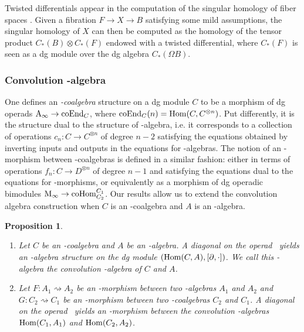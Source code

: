 \documentclass[10pt]{amsart}
\newtheorem{proposition}[definition]{Proposition}
\theoremstyle{remark}
\begin{document}
Twisted differentials appear in the computation of the singular homology of fiber spaces \cite{Brown59}. 
Given a fibration $F \rightarrow X \rightarrow B$ satisfying some mild assumptions, the singular homology of $X$ can then be computed as the homology of the tensor product $C_*(B) \otimes C_*(F)$ endowed with a twisted differential, where $C_*(F)$ is seen as a dg module over the dg algebra $C_*(\Omega B)$.

\subsubsection{Convolution \Ainf -algebra} \label{sss:conv-ainf-alg}

One defines an \textit{\Ainf -coalgebra} structure on a dg module $C$ to be a morphism of dg operads $\mathrm{A}_\infty \rightarrow \mathrm{coEnd}_C$, where $\mathrm{coEnd}_C(n) = \mathrm{Hom} ( C , C^{\otimes n} )$. 
Put differently, it is the structure dual to the structure of \Ainf -algebra, i.e. it corresponds to a collection of operations $c_n : C \rightarrow C^{\otimes n}$ of degree $n-2$ satisfying the equations obtained by inverting inputs and outputs in the equations for \Ainf -algebras. 
The notion of an \Ainf -morphism between \Ainf -coalgebras is defined in a similar fashion: either in terms of operations $f_n : C \rightarrow D^{\otimes n}$ of degree $n-1$ and satisfying the equations dual to the equations for \Ainf -morphisms, or equivalently as a morphism of dg operadic bimodules $\mathrm{M}_\infty \rightarrow \mathrm{coHom}^{C_1}_{C_2}$.
Our results allow us to extend the convolution algebra construction when $C$ is an \Ainf -coalgebra and $A$ is an \Ainf -algebra.

\begin{proposition} 
\label{prop:convolution-ainf} $ $
\begin{enumerate}[leftmargin=*]
    \item Let $C$ be an \Ainf -coalgebra and $A$ be an \Ainf -algebra. 
A diagonal on the operad \Ainf\ yields an \Ainf -algebra structure on the dg module $(\mathrm{Hom} (C,A) , [\partial,\cdot])$. 
We call this \Ainf -algebra the \emph{convolution \Ainf -algebra of $C$ and $A$}.
\item Let $F : A_1 \rightsquigarrow A_2$ be an \Ainf -morphism between two \Ainf -algebras $A_1$ and $A_2$ and $G : C_2 \rightsquigarrow C_1$ be an \Ainf -morphism between two \Ainf -coalgebras $C_2$ and $C_1$. A diagonal on the operad \Minf\ yields  an \Ainf -morphism between the convolution \Ainf -algebras $\mathrm{Hom} (C_1,A_1)$ and $\mathrm{Hom} (C_2,A_2)$. 
\end{enumerate}
\end{proposition}
\end{document}
